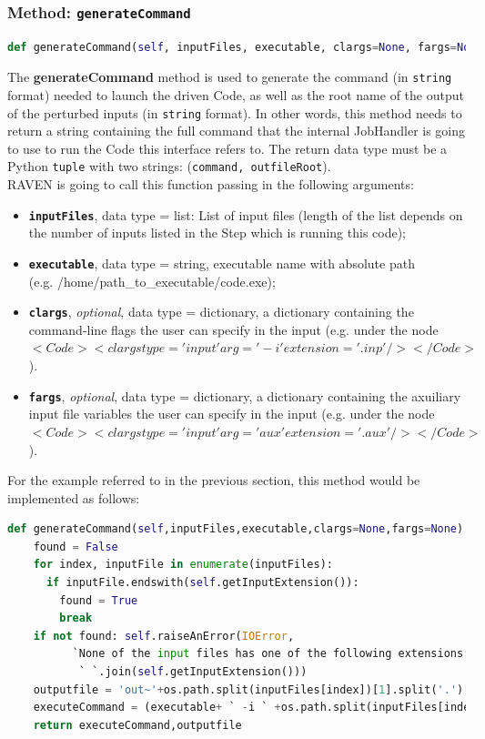 \subsubsection{Method: \texttt{generateCommand}}
\label{subsubsec:generateCommand}
\begin{lstlisting}[language=python]
def generateCommand(self, inputFiles, executable, clargs=None, fargs=None)
\end{lstlisting} 
The \textbf{generateCommand} method is used to generate the command 
(in \texttt{string} format) needed to launch the driven Code, as well as the root name of the output of the perturbed inputs (in \texttt{string} format).
 In other words, this 
method needs to return a string containing the full command 
that the internal JobHandler is going to use to run the Code this interface refers to. 
The return data type must be a Python \texttt{tuple} with two strings: (\texttt{command, outfileRoot}).
\\RAVEN is going to call this function passing in the following arguments:
\begin{itemize}
  \item \textbf{\texttt{inputFiles}}, data type = list: List of input files (length of the list depends on the 
           number of inputs listed in the Step which is running this code);
  \item \textbf{\texttt{executable}}, data type = string, executable name with absolute 
            path \\(e.g. /home/path\_to\_executable/code.exe);
  \item  \textbf{\texttt{clargs}}, \emph{optional}, data type = dictionary, a dictionary containing the command-line flags the 
               user can specify in the input (e.g. under the node $<Code><clargs type='input' arg='-i' extension='.inp'/></Code>$).
  \item  \textbf{\texttt{fargs}}, \emph{optional}, data type = dictionary, a dictionary containing the axuiliary input file variables the 
               user can specify in the input (e.g. under the node $<Code><clargs type='input' arg='aux' extension='.aux'/></Code>$).
\end{itemize}
For the example referred to in the previous section, this method would be implemented as follows:
\newline
\begin{lstlisting}[language=python]
  def generateCommand(self,inputFiles,executable,clargs=None,fargs=None):
    found = False
    for index, inputFile in enumerate(inputFiles):
      if inputFile.endswith(self.getInputExtension()):
        found = True
        break
    if not found: self.raiseAnError(IOError,
          `None of the input files has one of the following extensions: ` +
           ` `.join(self.getInputExtension()))
    outputfile = 'out~'+os.path.split(inputFiles[index])[1].split('.')[0]
    executeCommand = (executable+ ` -i ` +os.path.split(inputFiles[index])[1])
    return executeCommand,outputfile
\end{lstlisting} 


